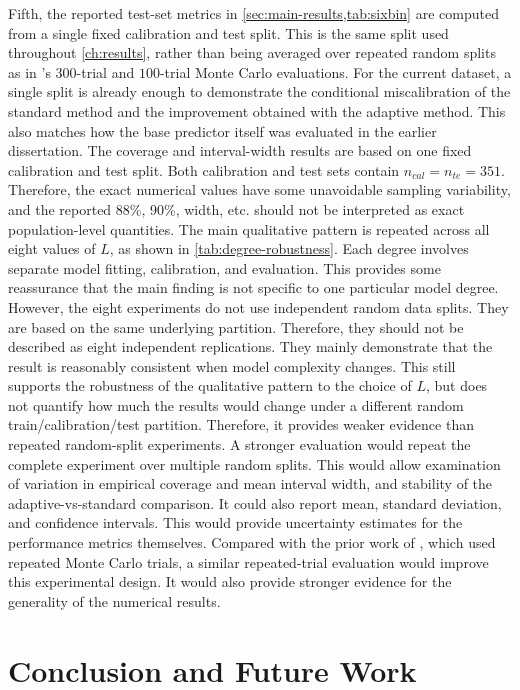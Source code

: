\documentclass[11pt,a4paper]{report}
\begin{document}
Fifth, the reported test-set metrics in \cref{sec:main-results,tab:sixbin} are computed from a single fixed calibration and test split. This is the same split used throughout \cref{ch:results}, rather than being averaged over repeated random splits as in \citeauthor{amirishahbazi2026}'s $300$-trial and $100$-trial Monte Carlo evaluations. For the current dataset, a single split is already enough to demonstrate the conditional miscalibration of the standard method and the improvement obtained with the adaptive method. This also matches how the base predictor itself was evaluated in the earlier dissertation. The coverage and interval-width results are based on one fixed calibration and test split. Both calibration and test sets contain $n_{cal}=n_{te}=351$. Therefore, the exact numerical values have some unavoidable sampling variability, and the reported 88\%, 90\%, width, etc. should not be interpreted as exact population-level quantities. The main qualitative pattern is repeated across all eight values of $L$, as shown in \cref{tab:degree-robustness}. Each degree involves separate model fitting, calibration, and evaluation. This provides some reassurance that the main finding is not specific to one particular model degree. However, the eight experiments do not use independent random data splits. They are based on the same underlying partition. Therefore, they should not be described as eight independent replications. They mainly demonstrate that the result is reasonably consistent when model complexity changes. This still supports the robustness of the qualitative pattern to the choice of $L$, but does not quantify how much the results would change under a different random train/calibration/test partition. Therefore, it provides weaker evidence than repeated random-split experiments. A stronger evaluation would repeat the complete experiment over multiple random splits. This would allow examination of variation in empirical coverage and mean interval width, and stability of the adaptive-vs-standard comparison. It could also report mean, standard deviation, and confidence intervals. This would provide uncertainty estimates for the performance metrics themselves. Compared with the prior work of \citeauthor{amirishahbazi2026}, which used repeated Monte Carlo trials, a similar repeated-trial evaluation would improve this experimental design. It would also provide stronger evidence for the generality of the numerical results. 
 
\chapter{Conclusion and Future Work}
\label{ch:conclusion}
\end{document}
